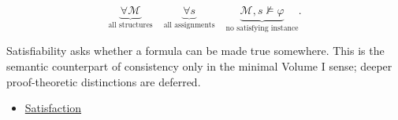 \begin{remark*}
\[
\underbrace{\forall \mathcal M}_{\text{all structures}}
\quad
\underbrace{\forall s}_{\text{all assignments}}
\quad
\underbrace{\mathcal M,s\not\models\varphi}_{\text{no satisfying instance}}.
\]
\end{remark*}

\begin{remark*}[Interpretation]
Satisfiability asks whether a formula can be made true somewhere. This is the
semantic counterpart of consistency only in the minimal Volume I sense; deeper
proof-theoretic distinctions are deferred.
\end{remark*}

\begin{dependencies}
\begin{itemize}
  \item \hyperref[def:fol-satisfaction]{Satisfaction}
\end{itemize}
\end{dependencies}
